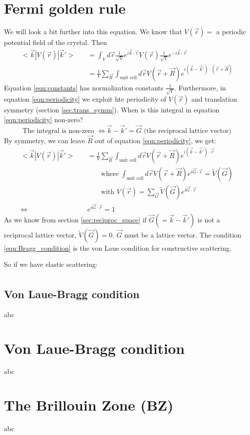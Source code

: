\section{Fermi golden rule}
We will look a bit further into this equation. We know that $V(\vec{r})=$ a periodic potential field of the crystal. Then
\begin{align}
	<\vec{k}|V(\vec{r})|\vec{k}'> \quad &= \int_{V}^{}d\vec{r}\frac{1}{\sqrt{V}}e^{i\vec{k}\cdot\vec{r}}V(\vec{r})\frac{1}{\sqrt{V}}e^{-i\vec{k}\cdot\vec{r}} \label{eqn:constants}\\
	&= \frac{1}{V}\sum_{\vec{R}}^{}\int_{\text{unit cell}}^{}d\vec{r}V(\vec{r}+\vec{R})e^{i(\vec{k}-\vec{k}')\cdot(\vec{r}+\vec{R})} \label{eqn:periodicity}
\end{align}
Equation \ref{eqn:constants} has normalization constants $\frac{1}{\sqrt{V}}$. Furthermore, in equation \ref{eqn:periodicity} we exploit hte periodicity of $V(\vec{r})$ and translation symmetry (section \ref{sec:trans_symm}). When is this integral in equation \ref{eqn:periodicity} non-zero?
\begin{equation}
	\text{The integral is non-zero } \iff \vec{k} - \vec{k}' = \vec{G} \text{ (the reciprocal lattice vector)} \label{eqn:Bragg_condition}
\end{equation}
By symmetry, we can leave $\vec{R}$ out of equation \ref{eqn:periodicity}, we get:
\begin{align}
	<\vec{k}|V(\vec{r})|\vec{k}'> \quad &= \frac{1}{V}\sum_{\vec{R}}^{}\int_{\text{unit cell}}^{}d\vec{r}V(\vec{r}+\vec{R})e^{i(\vec{k}-\vec{k}')\cdot\vec{r}}\\
	&\qquad\text{where } \int_{\text{unit cell}}^{}d\vec{r}V(\vec{r}+\vec{R})e^{i\vec{G}\cdot\vec{r}} = \tilde{V}(\vec{G})\\
	&\qquad\text{with } V(\vec{r}) = \sum_{\vec{G}}^{}\tilde{V}(\vec{G})e^{i\vec{G}\cdot\vec{r}}\\
	\iff & e^{i\vec{G}\cdot\vec{r}} = 1
\end{align}
As we know from section \ref{sec:reciproc_space} if $\vec{G} (= \vec{k} - \vec{k}')$ is not a reciprocal lattice vector, $\tilde{V}(\vec{G}) = 0$. $\vec{G}$ must be a lattice vector. The condition \ref{eqn:Bragg_condition} is the von Laue condition for constructive scattering.\par
So if we have elastic scattering:
\begin{align}

\end{align}
\subsection{Von Laue-Bragg condition} \label{sec:bragg}
abc

\section{Von Laue-Bragg condition}
abc

\section{The Brillouin Zone (BZ)} \label{sec:Brillouin}
abc
